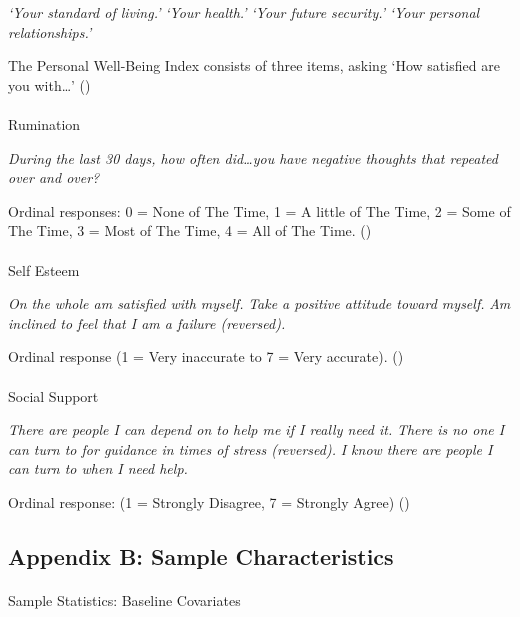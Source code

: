 \documentclass[
  single column]{article}
\makeatletter
\let\oldparagraph\paragraph
\renewcommand{\paragraph}{
    \@ifstar
      \xxxParagraphStar
      \xxxParagraphNoStar
  }
\newcommand{\xxxParagraphStar}[1]{\oldparagraph*{#1}\mbox{}}
\newcommand{\xxxParagraphNoStar}[1]{\oldparagraph{#1}\mbox{}}
\makeatother
\begin{document}
\emph{`Your standard of living.'} \emph{`Your health.'} \emph{`Your
future security.'} \emph{`Your personal relationships.'}

The Personal Well-Being Index consists of three items, asking `How
satisfied are you with\ldots{}'
()

\paragraph{Rumination}\label{rumination}

\emph{During the last 30 days, how often did\ldots you have negative
thoughts that repeated over and over?}

Ordinal responses: 0 = None of The Time, 1 = A little of The Time, 2 =
Some of The Time, 3 = Most of The Time, 4 = All of The Time.
()

\paragraph{Self Esteem}\label{self-esteem}

\emph{On the whole am satisfied with myself.} \emph{Take a positive
attitude toward myself.} \emph{Am inclined to feel that I am a failure
(reversed).}

Ordinal response (1 = Very inaccurate to 7 = Very accurate).
()

\paragraph{Social Support}\label{social-support}

\emph{There are people I can depend on to help me if I really need it.}
\emph{There is no one I can turn to for guidance in times of stress
(reversed).} \emph{I know there are people I can turn to when I need
help.}

Ordinal response: (1 = Strongly Disagree, 7 = Strongly Agree)
()

\newpage{}

\subsection{Appendix B: Sample Characteristics}\label{appendix-sample}

\paragraph{Sample Statistics: Baseline
Covariates}\label{sample-statistics-baseline-covariates}
\end{document}

